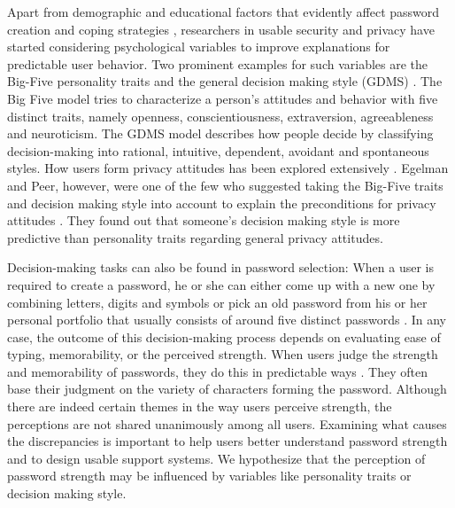Apart from demographic and educational factors that evidently affect password creation and coping strategies \cite{Mazurek2013Measuring}, researchers in usable security and privacy have started considering psychological variables to improve explanations for predictable user behavior. Two prominent examples for such variables are the Big-Five personality traits \cite{Goldberg1990BigFive} and the general decision making style (GDMS) \cite{Scott1995GDMS}. The Big Five model tries to characterize a person's attitudes and behavior with five distinct traits, namely openness, conscientiousness, extraversion, agreeableness and neuroticism. The GDMS model describes how people decide by classifying decision-making into rational, intuitive, dependent, avoidant and spontaneous styles. How users form privacy attitudes has been explored extensively \cite{Acquisti2005PrivacyRationality,Korff2014TooMuchChoice,Spiekermann2001,Woodruff2014}. Egelman and Peer, however, were one of the few who suggested taking the Big-Five traits and decision making style into account to explain the preconditions for privacy attitudes \cite{Egelman2015AverageUser}. They found out that someone's decision making style is more predictive than personality traits regarding general privacy attitudes. %


Decision-making tasks can also be found in password selection: When a user is required to create a password, he or she can either come up with a new one by combining letters, digits and symbols or pick an old password from his or her personal portfolio that usually consists of around five distinct passwords \cite{Florencio2007LargeScaleStudyPasswordHabits}. In any case, the outcome of this decision-making process depends on evaluating ease of typing, memorability, or the perceived strength. When users judge the strength and memorability of passwords, they do this in predictable ways \cite{Ur2016PerceptionsPassword}. They often base their judgment on the variety of characters forming the password. Although there are indeed certain themes in the way users perceive strength, the perceptions are not shared unanimously among all users. Examining what causes the discrepancies is important to help users better understand password strength and to design usable support systems. We hypothesize that the perception of password strength may be influenced by variables like personality traits or decision making style. 

